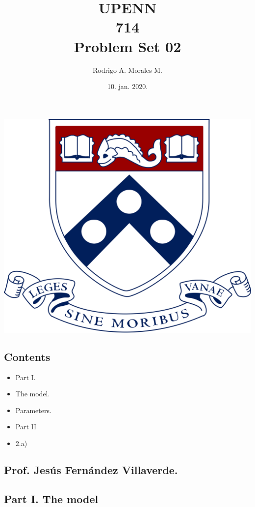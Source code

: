 \documentclass{article}
\title{UPENN \\714 \\ Problem Set 02\\ }
\author{Rodrigo A. Morales M.}
\date{10. jan. 2020.}
\begin{document}
\maketitle

\begin{center}
   \includegraphics[scale=0.05]{logo1.png}
\end{center}

    
\subsection*{Contents}


\begin{itemize}
\setlength{\itemsep}{-1ex}
   \item Part I.
   \item The model.
   \item Parameters.
   \item Part II
   \item 2.a) 
\end{itemize}


\subsection*{Prof. Jesús Fernández Villaverde.}


\subsection*{Part I. The model}
\end{document}
